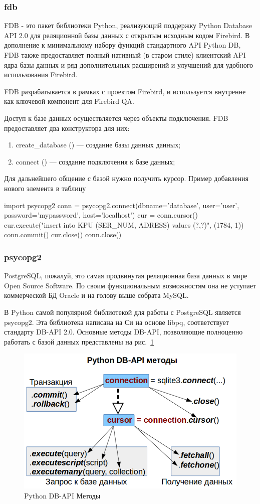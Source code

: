 \subsubsection{fdb}
FDB - это пакет библиотеки Python, реализующий поддержку Python Database API 2.0 для реляционной базы данных с открытым исходным кодом Firebird. В дополнение к минимальному набору функций стандартного API Python DB, FDB также предоставляет полный нативный (в старом стиле) клиентский API ядра базы данных и ряд дополнительных расширений и улучшений для удобного использования Firebird.\cite{fdb}

FDB разрабатывается в рамках с проектом Firebird, и используется внутренне как ключевой компонент для Firebird QA.\cite{firebird}

Доступ к базе данных осуществляется через объекты подключения. FDB предоставляет два конструктора для них:
\begin{enumerate}
	\item create\_database () --- создание базы данных данных;
	\item connect () --- создание подключения к базе данных;
\end{enumerate}
Для дальнейшего общение с базой нужно получить курсор. Пример добавления нового элемента в таблицу
\begin{MyCode}
import psycopg2
conn = psycopg2.connect(dbname='database', user='user', 
password='mypassword', host='localhost')
cur = conn.cursor()
cur.execute("insert into KPU (SER\_NUM, ADRESS) values (?,?)",
		(1784, 1))
conn.commit()
cur.close()
conn.close()
\end{MyCode}
\subsubsection{psycopg2}
PostgreSQL, пожалуй, это самая продвинутая реляционная база данных в мире Open Source Software. По своим функциональным возможностям она не уступает коммерческой БД Oracle и на голову выше собрата MySQL.\cite{psycopg}

В Python самой популярной библиотекой для работы с PostgreSQL является psycopg2. Эта библиотека написана на Си на основе libpq, соответствует стандарту DB-API 2.0. Основные методы DB-API, позволяющие полноценно работать с базой данных представлены на рис.~\ref{fig:pythondb-api}

\begin{figure}[H]
	\centering
	\includegraphics[width=0.7\linewidth]{pics/pythonDB-API}
	\caption{Python DB-API Методы}
	\label{fig:pythondb-api}
\end{figure}
 

